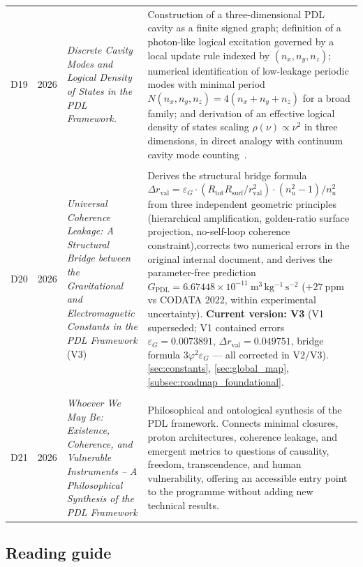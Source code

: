 \documentclass[11pt,a4paper]{article}
\begin{document}
\begin{longtable}{@{}llL{4cm}p{9.5cm}@{}}
D19 &
2026 &
\emph{Discrete Cavity Modes and Logical Density of States in the PDL Framework.}
 & Construction of a three-dimensional PDL cavity as a finite signed graph; definition of a photon-like logical excitation governed by a local update rule indexed by $(n_x,n_y,n_z)$; numerical identification of low-leakage periodic modes with minimal period $N(n_x,n_y,n_z)=4(n_x+n_y+n_z)$ for a broad family; and derivation of an effective logical density of states scaling $\rho(\nu)\propto \nu^2$ in three dimensions, in direct analogy with continuum cavity mode counting~\citep{PDLCavityModes2026}.\\\\[0.4em]

D20 & 
2026 &
\emph{Universal Coherence Leakage: A Structural Bridge between the Gravitational and Electromagnetic Constants in the PDL Framework} (V3) 
& Derives the structural bridge formula $\Delta r_{\mathrm{val}} = \varepsilon_G \cdot (R_{\mathrm{tot}} R_{\mathrm{surf}}/r_{\mathrm{val}}^2) \cdot (n_u^2-1)/n_u^2$ from three independent geometric principles (hierarchical amplification, golden-ratio surface projection, no-self-loop coherence constraint),corrects two numerical errors in the original internal document, and derives the parameter-free prediction $G_{\mathrm{PDL}} = 6.67448\times10^{-11}~\mathrm{m^3\,kg^{-1}\,s^{-2}}$ ($+27~\mathrm{ppm}$ vs CODATA 2022, within experimental uncertainty). \textbf{Current version: V3} (V1 superseded; V1 contained errors $\varepsilon_G = 0.0073891$, $\Delta r_{\mathrm{val}} = 0.049751$, bridge formula $3\varphi^2\varepsilon_G$ — all corrected in V2/V3). \citep{Universal_Coherence_Leakage_V3_2026} \ref{sec:constants}, \ref{sec:global_map}, \ref{subsec:roadmap_foundational}.\\\\[0.4em]

D21 & 2026 & \textit{Whoever We May Be: Existence, Coherence, and Vulnerable Instruments -- A Philosophical Synthesis of the PDL Framework} &
Philosophical and ontological synthesis of the PDL framework. Connects minimal closures, proton architectures, coherence leakage, and emergent metrics to questions of causality, freedom, transcendence, and human vulnerability, offering an accessible entry point to the programme without adding new technical results.\citep{WhoeverWeMayBe2026} \\[0.5em]

\bottomrule
\end{longtable}

\subsection*{Reading guide}
\end{document}
